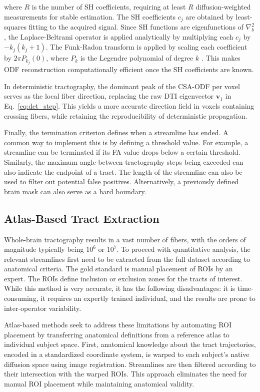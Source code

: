 where $R$ is the number of SH coefficients, requiring at least $R$ diffusion-weighted measurements for stable estimation. The SH coefficients $c_j$ are obtained by least-squares fitting to the acquired signal. Since SH functions are eigenfunctions of $\nabla_b^2$, the Laplace-Beltrami operator is applied analytically by multiplying each $c_j$ by $-k_j(k_j+1)$. The Funk-Radon transform is applied by scaling each coefficient by $2\pi P_{k_j}(0)$, where $P_k$ is the Legendre polynomial of degree $k$ \cite{aganj2010reconstruction}. This makes ODF reconstruction computationally efficient once the SH coefficients are known.

In deterministic tractography, the dominant peak of the CSA-ODF per voxel serves as the local fiber direction, replacing the raw DTI eigenvector $\mathbf{v}_1$ in Eq.~\ref{eq:det_step}. This yields a more accurate direction field in voxels containing crossing fibers, while retaining the reproducibility of deterministic propagation.

Finally, the termination criterion defines when a streamline has ended. A common way to implement this is by defining a threshold value. For example, a streamline can be terminated if its FA value drops below a certain threshold. Similarly, the maximum angle between tractography steps being exceeded can also indicate the endpoint of a tract. The length of the streamline can also be used to filter out potential false positives. Alternatively, a previously defined brain mask can also serve as a hard boundary.

\clearpage

\subsection{Atlas-Based Tract Extraction}
\label{subsec:background_atlasbasedextraction}

Whole-brain tractography results in a vast number of fibers, with the orders of magnitude typically being $10^6$ or $10^7$. To proceed with quantitative analysis, the relevant streamlines first need to be extracted from the full dataset according to anatomical criteria. The gold standard is manual placement of ROIs by an expert. The ROIs define inclusion or exclusion zones for the tracts of interest. While this method is very accurate, it has the following disadvantages: it is time-consuming, it requires an expertly trained individual, and the results are prone to inter-operator variability.

Atlas-based methods seek to address these limitations by automating ROI placement by transferring anatomical definitions from a reference atlas to individual subject space. First, anatomical knowledge about the tract trajectories, encoded in a standardized coordinate system, is warped to each subject's native diffusion space using image registration. Streamlines are then filtered according to their intersection with the warped ROIs. This approach eliminates the need for manual ROI placement while maintaining anatomical validity.

